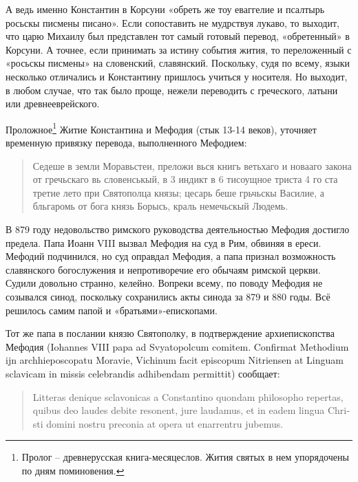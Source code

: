 А ведь именно Константин в Корсуни «обреть же тоу еваггелие и псалтырь росьскы писмены писано». Если сопоставить не мудрствуя лукаво, то выходит, что царю Михаилу был представлен тот самый готовый перевод, «обретенный» в Корсуни. А точнее, если принимать за истину события жития, то переложенный с «росьскы писмены» на словенский, славянский. Поскольку, судя по всему, языки несколько отличались и Константину пришлось учиться у носителя. Но выходит, в любом случае, что так было проще, нежели переводить с греческого, латыни или древнееврейского.

Проложное\footnote{Пролог – древнерусская книга-месяцеслов. Жития святых в нем упорядочены по дням поминовения.} Житие Константина и Мефодия (стык 13-14 веков), уточняет временную привязку перевода, выполненного Мефодием:

\begin{quotation}
Седеше в земли Моравьстеи, преложи вься книгь ветьхаго и новааго закона от гречьскаго вь словенськый, в 3 индикт в 6 тисоущное триста 4 го ста третие лето при Святополца князы; цесарь беше грьчьскы Василие, а бльгаромь от бога князь Борысь, краль немечьскый Людемь.
\end{quotation}

В 879 году недовольство римского руководства деятельностью Мефодия достигло предела. Папа Иоанн VIII вызвал Мефодия на суд в Рим, обвиняя в ереси. Мефодий подчинился, но суд оправдал Мефодия, а папа признал возможность славянского богослужения и непротиворечие его обычаям римской церкви. Судили довольно странно, келейно. Вопреки всему, по поводу Мефодия не созывался синод, поскольку сохранились акты синода за 879 и 880 годы. Всё решилось самим папой и «братьями»-епископами.

Тот же папа в послании князю Святополку, в подтверждение архиепископства Мефодия (Iohannes VIII papa ad Svyatopolcum comitem. Confirmat Methodium ijn archhieposcopatu Moravie, Vichinum facit episcopum Nitriensen at Linguam sclavicam in missis celebrandis adhi\-bendam permittit) сообщает:

\begin{quotation}
\begin{otherlanguage}{latin}
Litteras denique sclavonicas a Constantino quondam philosopho repertas, quibus deo laudes debite resonent, jure laudamus, et in eadem lingua Christi domini nostru preconia at opera ut enarren\-tru jubemus.
\end{otherlanguage}
\end{quotation}

